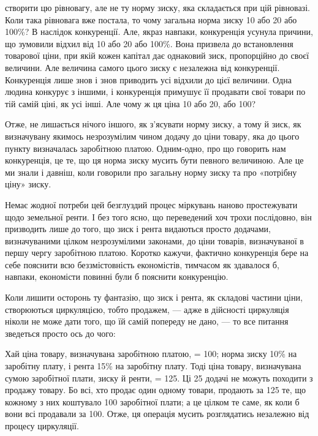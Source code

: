 \parcont{}  %
створити цю рівновагу, але не ту норму зиску, яка складається при цій рівновазі.
Коли така рівновага вже постала, то чому загальна норма зиску 10 або
20 або 100\%? В наслідок конкуренції. Але, якраз навпаки, конкуренція усунула
причини, що зумовили відхил від 10 або 20 або 100\%. Вона призвела
до встановлення товарової ціни, при якій кожен капітал дає однаковий зиск,
пропорційно до своєї величини. Але величина самого цього зиску є незалежна
від конкуренції. Конкуренція лише знов і знов приводить усі відхили до цієї
величини. Одна людина конкурує з іншими, і конкуренція примушує її продавати
свої товари по тій самій ціні, як усі інші. Але чому ж ця ціна 10 або
20, або 100?

Отже, не лишається нічого іншого, як з’ясувати норму зиску, а тому й
зиск, як визначувану якимось незрозумілим чином додачу до ціни товару, яка
до цього пункту визначалась заробітною платою. Одним-одно, про що говорить
нам конкуренція, це те, що ця норма зиску мусить бути певного величиною.
Але це ми знали і давніш, коли говорили про загальну норму зиску та про
«потрібну ціну» зиску.

Немає жодної потреби цей безглуздий процес міркувань наново простежувати
щодо земельної ренти. І без того ясно, що переведений хоч трохи послідовно,
він призводить лише до того, що зиск і рента видаються просто додачами,
визначуваними цілком незрозумілими законами, до ціни товарів, визначуваної
в першу чергу заробітною платою. Коротко кажучи, фактично конкуренція
бере на себе пояснити всю беззмістовність економістів, тимчасом як здавалося б,
навпаки, економісти повинні були б пояснити конкуренцію.

Коли лишити осторонь ту фантазію, що зиск і рента, як складові частини
ціни, створюються циркуляцією, тобто продажем, — адже в дійсності циркуляція
ніколи не може дати того, що їй самій попереду не дано, — то все питання зведеться
просто ось до чого:

Хай ціна товару, визначувана заробітною платою, = 100; норма зиску
10\% на заробітну плату, і рента 15\% на заробітну плату. Тоді ціна товару,
визначувана сумою заробітної плати, зиску й ренти, = 125. Ці 25 додачі не
можуть походити з продажу товару. Бо всі, хто продає один одному товари,
продають за 125 те, що кожному з них коштувало 100 заробітної плати; а це
цілком те саме, як коли б вони всі продавали за 100. Отже, ця операція мусить
розглядатись незалежно від процесу циркуляції.

